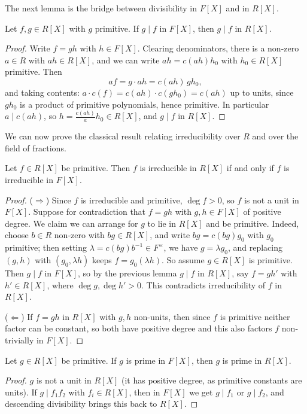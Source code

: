 The next lemma is the bridge between divisibility in $F[X]$ and in $R[X]$.

\begin{lemma}
	Let $f, g \in R[X]$ with $g$ primitive. If $g \mid f$ in $F[X]$, then $g \mid f$ in $R[X]$.
\end{lemma}
\begin{proof}
	Write $f = gh$ with $h \in F[X]$. Clearing denominators, there is a non-zero $a \in R$ with $ah \in R[X]$, and we can write $ah = c(ah)h_0$ with $h_0 \in R[X]$ primitive. Then
	$$
	af = g \cdot ah = c(ah)\, g h_0,
	$$
	and taking contents: $a \cdot c(f) = c(ah) \cdot c(g h_0) = c(ah)$ up to units, since $gh_0$ is a product of primitive polynomials, hence primitive. In particular $a \mid c(ah)$, so $h = \frac{c(ah)}{a}h_0 \in R[X]$, and $g \mid f$ in $R[X]$.
\end{proof}

We can now prove the classical result relating irreducibility over $R$ and over the field of fractions.

\begin{lemma}
	Let $f \in R[X]$ be primitive. Then $f$ is irreducible in $R[X]$ if and only if $f$ is irreducible in $F[X]$.
\end{lemma}
\begin{proof}
	($\Rightarrow$) Since $f$ is irreducible and primitive, $\deg f > 0$, so $f$ is not a unit in $F[X]$. Suppose for contradiction that $f = gh$ with $g, h \in F[X]$ of positive degree. We claim we can arrange for $g$ to lie in $R[X]$ and be primitive. Indeed, choose $b \in R$ non-zero with $bg \in R[X]$, and write $bg = c(bg)g_0$ with $g_0$ primitive; then setting $\lambda = c(bg)b^{-1} \in F^\times$, we have $g = \lambda g_0$, and replacing $(g, h)$ with $(g_0, \lambda h)$ keeps $f = g_0 (\lambda h)$. So assume $g \in R[X]$ is primitive. Then $g \mid f$ in $F[X]$, so by the previous lemma $g \mid f$ in $R[X]$, say $f = g h'$ with $h' \in R[X]$, where $\deg g, \deg h' > 0$. This contradicts irreducibility of $f$ in $R[X]$.

	($\Leftarrow$) If $f = gh$ in $R[X]$ with $g, h$ non-units, then since $f$ is primitive neither factor can be constant, so both have positive degree and this also factors $f$ non-trivially in $F[X]$.
\end{proof}

\begin{lemma}
	Let $g \in R[X]$ be primitive. If $g$ is prime in $F[X]$, then $g$ is prime in $R[X]$.
\end{lemma}
\begin{proof}
	$g$ is not a unit in $R[X]$ (it has positive degree, as primitive constants are units). If $g \mid f_1 f_2$ with $f_i \in R[X]$, then in $F[X]$ we get $g \mid f_1$ or $g \mid f_2$, and descending divisibility brings this back to $R[X]$.
\end{proof}

